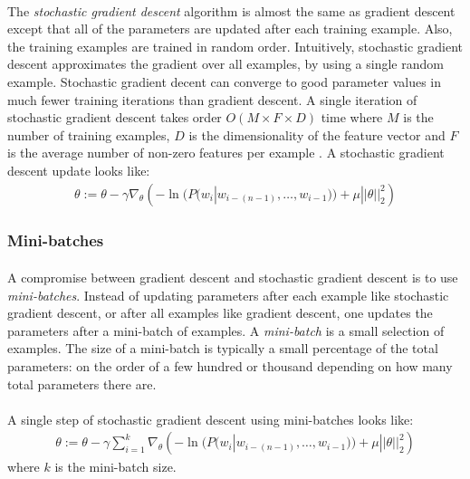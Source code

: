 \paragraph{}
The \emph{stochastic gradient descent} algorithm is almost the same as gradient descent except that all of the parameters are updated after each training example. Also, the training examples are trained in random order. Intuitively, stochastic gradient descent approximates the gradient over all examples, by using a single random example. Stochastic gradient decent can converge to good parameter values in much fewer training iterations than gradient descent. A single iteration of stochastic gradient descent takes order $O(M\times F \times D)$ time where $M$ is the number of training examples, $D$ is the dimensionality of the feature vector and $F$ is the average number of non-zero features per example \cite{Elkan2013}. 
A stochastic gradient descent update looks like:
\begin{align}
\theta := \theta - \gamma \nabla_\theta \left( -\ln(P(w_i | w_{i-(n-1)},\dots, w_{i-1})) +  \mu ||\theta||^2_2 \right)
\end{align}
\subsubsection{Mini-batches}
\paragraph{}
A compromise between gradient descent and stochastic gradient descent is to use \emph{mini-batches}. Instead of updating parameters after each example like stochastic gradient descent, or after all examples like gradient descent, one updates the parameters after a mini-batch of examples. A \emph{mini-batch} is a small selection of examples. The size of a mini-batch is typically a small percentage of the total parameters: on the order of a few hundred or thousand depending on how many total parameters there are.
\paragraph{}
A single step of stochastic gradient descent using mini-batches looks like:
\begin{align}
\theta := \theta - \gamma  \sum_{i=1}^{k} \nabla_\theta \left( -\ln(P(w_i | w_{i-(n-1)},\dots, w_{i-1})) +  \mu ||\theta||^2_2 \right)
\end{align}
where $k$ is the mini-batch size.

